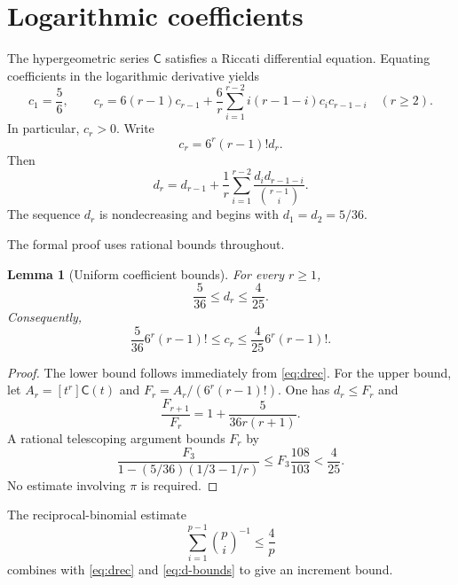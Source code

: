 \documentclass[11pt]{article}
\newtheorem{lemma}[theorem]{Lemma}
\theoremstyle{definition}
\theoremstyle{remark}
\newcommand{\C}{\mathsf C}
\begin{document}
\section{Logarithmic coefficients}\label{sec:coeff}

The hypergeometric series $\C$ satisfies a Riccati differential equation.
Equating coefficients in the logarithmic derivative yields
\begin{equation}\label{eq:crec}
  c_1=\frac56,
  \qquad
  c_r=6(r-1)c_{r-1}
       +\frac6r\sum_{i=1}^{r-2}i(r-1-i)c_ic_{r-1-i}
       \quad(r\ge2).
\end{equation}
In particular, $c_r>0$.  Write
\begin{equation}\label{eq:ddef}
  c_r=6^r(r-1)!d_r.
\end{equation}
Then
\begin{equation}\label{eq:drec}
  d_r=d_{r-1}+\frac1r\sum_{i=1}^{r-2}
   \frac{d_id_{r-1-i}}{\binom{r-1}{i}}.
\end{equation}
The sequence $d_r$ is nondecreasing and begins with
$d_1=d_2=5/36$.

The formal proof uses rational bounds throughout.

\begin{lemma}[Uniform coefficient bounds]\label{lem:d-bounds}
For every $r\ge1$,
\begin{equation}\label{eq:d-bounds}
  \frac5{36}\le d_r\le\frac4{25}.
\end{equation}
Consequently,
\begin{equation}\label{eq:c-bounds}
 \frac5{36}6^r(r-1)!\le c_r\le
 \frac4{25}6^r(r-1)!.
\end{equation}
\end{lemma}

\begin{proof}
The lower bound follows immediately from \eqref{eq:drec}.  For the upper
bound, let $A_r=[t^r]\C(t)$ and
$F_r=A_r/(6^r(r-1)!)$.  One has $d_r\le F_r$ and
\[
  \frac{F_{r+1}}{F_r}=1+\frac{5}{36r(r+1)}.
\]
A rational telescoping argument bounds $F_r$ by
\[
  \frac{F_3}{1-(5/36)(1/3-1/r)}
  \le F_3\frac{108}{103}<\frac4{25}.
\]
No estimate involving $\pi$ is required.
\end{proof}

The reciprocal-binomial estimate
\begin{equation}\label{eq:binom-recip}
  \sum_{i=1}^{p-1}\binom pi^{-1}\le\frac4p
\end{equation}
combines with \eqref{eq:drec} and \eqref{eq:d-bounds} to give an increment
bound.
\end{document}
